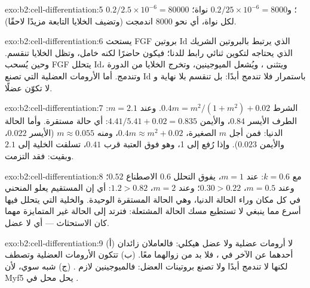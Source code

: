 \begin{solution}{exo:b2:cell-differentiation:5}
$0.2/2.5\times 10^{-6} = \num{80000}$ ؛ و$0.2/25\times 10^{-6}
= \num{8000}$ نواة؛  لكل نواة، أي نحو \num{8000}
 اندمجت (وتضيف الخلايا التابعة مزيدًا لاحقًا).
\end{solution}

\begin{solution}{exo:b2:cell-differentiation:6}
يستحث FGF بروتين Id الذي يرتبط بالبروتين الشريك الذي يحتاجه  لتكوين
ثنائي رابط للدنا؛ فيكون  حاضرًا لكنه خامل، وتظل الخلايا
تنقسم. وحين يُسحب FGF يتحلل Id، ويتثنى ، ويُشعل
الميوجينين، وتخرج الخلايا من الدورة وتندمج. أما الأرومات العضلية
التي تصنع Id باستمرار فلا تندمج أبدًا: بل تنقسم بلا نهاية و
لا تكوّن عضلًا.
\end{solution}

\begin{solution}{exo:b2:cell-differentiation:7}
الشرط $0.4m = m^{2}/(1 + m^{2}) + 0.02$. وعند $m = 2.1$: الطرف الأيسر
$0.84$، والأيمن $4.41/5.41 + 0.02 = 0.835$: أي حالة مستقرة. وأما الحالة
الدنيا: فمن أجل $m$ الصغيرة، $0.4m \approx m^{2} + 0.02$، ومنه $m \approx
0.055$ (الأيسر $0.022$، والأيمن $0.023$). وإذا رُفع إلى 1، وهو فوق
العتبة قرب $0.41$، تسلقت الخلية إلى $2.1$ وبقيت: فقد
التزمت.
\end{solution}

\begin{solution}{exo:b2:cell-differentiation:8}
مع $k = 0.6$: عند $m = 1$، يفوق التحلل $0.6$ الاصطناع
$0.52$؛ وعند $m = 0.5$، $0.30 > 0.22$؛ وعند $m = 2$، $1.2 > 0.82$: أي إن
المستقيم يعلو المنحني في كل مكان وراء الحالة الدنيا، وهي
الحالة المستقرة الوحيدة. والخلية التي يتحلل  فيها أسرع مما ينبغي
لا تستطيع مسك الحالة المشتعلة: فترتد إلى الحالة غير
المتمايزة مهما كان الاستحثاث --- أي لا عضل.
\end{solution}

\begin{solution}{exo:b2:cell-differentiation:9}
(أ) لا أرومات عضلية ولا عضل هيكلي: فالعاملان زائدان
أحدهما عن الآخر في ، فلا بد من زوالهما معًا. (ب) تتكون الأرومات العضلية وتصطف
لكنها لا تندمج أبدًا ولا تصنع بروتينات العضل: فالميوجينين لازم
. (ج) شبه سوي، لأن Myf5 يحل محل
 في .
\end{solution}

